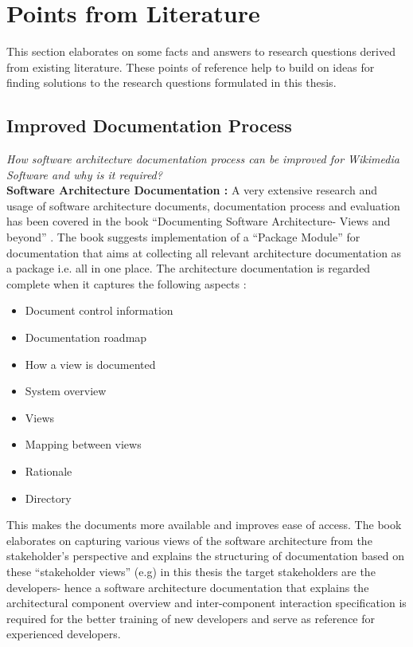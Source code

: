 \section{Points from Literature} 
\indent This section elaborates on some facts and answers to research questions derived from existing literature. These points of reference help to build on ideas for finding solutions to the research questions formulated in this thesis.
\subsection{Improved Documentation Process}
\indent \emph{How software architecture documentation process can be improved for
Wikimedia Software and why is it required?}
\newline
\\\indent \textbf{Software Architecture Documentation : } A very extensive research and usage of software architecture documents, documentation process and evaluation has been covered in the book \enquote{Documenting Software Architecture- Views and beyond} \cite{BachmannDocumentingSoftware2010}. The book suggests implementation of a \enquote{Package Module} for documentation that aims at collecting all relevant architecture documentation as a package i.e. all in one place. The architecture documentation is regarded complete when it captures the following aspects :
\begin{itemize}
\item Document control information 
\item Documentation roadmap 
\item How a view is documented
\item System overview 
\item Views 
\item Mapping between views 
\item Rationale
\item Directory
\end{itemize}
This makes the documents more available and improves ease of access. The book elaborates on capturing various views of the software architecture from the stakeholder's perspective and explains the structuring of documentation based on these \enquote{stakeholder views} (e.g) in this thesis the target stakeholders are the developers- hence a software architecture documentation that explains the architectural component overview and inter-component interaction specification is required for the better training of new developers and serve as reference for experienced developers.
